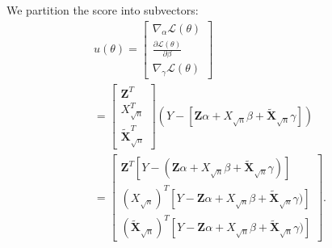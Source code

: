 \documentclass[12pt]{article}
\newcommand{\bs}[1]{\boldsymbol{#1}}
\begin{document}
We partition the score into subvectors:
\begin{multline*}
u(\theta) = \begin{bmatrix}
\nabla_\alpha \mathcal{L}(\theta) \\
\frac{\partial \mathcal{L}(\theta)}{\partial \beta} \\
\nabla_\gamma \mathcal{L}(\theta) 
\end{bmatrix} \\ = \begin{bmatrix} \bs{Z}^T \\ X_{\sqrt{n}}^T \\ \tilde{\bs{X}}_{\sqrt{n}}^T \end{bmatrix} \left(Y - [\bs{Z} \alpha + X_{\sqrt{n}} \beta + \tilde{\bs{X}}_{\sqrt{n}} \gamma] \right) \\ = 
\begin{bmatrix} \bs{Z}^T [Y - (\bs{Z}\alpha + X_{\sqrt{n}}\beta + \tilde{\bs{X}}_{\sqrt{n}}\gamma)] \\
(X_{\sqrt{n}})^T[Y - \bs{Z}\alpha + X_{\sqrt{n}}\beta + \tilde{\bs{X}}_{\sqrt{n}}\gamma)] \\
(\tilde{\bs{X}}_{\sqrt{n}})^T[Y - \bs{Z}\alpha + X_{\sqrt{n}}\beta + \tilde{\bs{X}}_{\sqrt{n}}\gamma)] \end{bmatrix}.
\end{multline*}
\end{document}
